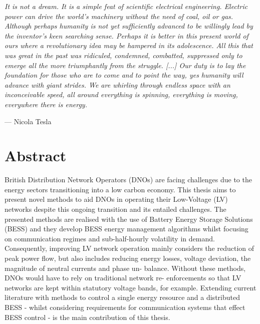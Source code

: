 
\epigraph{\textit{It is not a dream. It is a simple feat of scientific electrical engineering. Electric power can drive the world's machinery without the need of coal, oil or gas. Although perhaps humanity is not yet sufficiently advanced to be willingly lead by the inventor's keen searching sense. Perhaps it is better in this present world of ours where a revolutionary idea may be hampered in its adolescence. All this that was great in the past was ridiculed, condemned, combatted, suppressed only to emerge all the more triumphantly from the struggle. [...] Our duty is to lay the foundation for those who are to come and to point the way, yes humanity will advance with giant strides. We are whirling through endless space with an inconceivable speed, all around everything is spinning, everything is moving, everywhere there is energy.}}{--- Nicola Tesla}


\chapter*{Abstract}




British Distribution Network Operators (DNOs) are facing challenges due to the\linebreak
energy sectors transitioning into a low carbon economy. This thesis aims to present\linebreak
novel methods to aid DNOs in operating their Low-Voltage (LV) networks despite this\linebreak
ongoing transition and its entailed challenges. The presented methods are realised\linebreak
with the use of Battery Energy Storage Solutions (BESS) and they develop BESS\linebreak
energy management algorithms whilst focusing on communication regimes and\linebreak
sub-half-hourly volatility in demand. Consequently, improving LV network operation\linebreak
mainly considers the reduction of peak power flow, but also includes reducing\linebreak
energy losses, voltage deviation, the magnitude of neutral currents and phase un-\linebreak
balance. Without these methods, DNOs would have to rely on traditional network re-\linebreak
enforcements so that LV networks are kept within statutory voltage bands, for\linebreak
example. Extending current literature with methods to control a single energy\linebreak
resource and a distributed BESS - whilst considering requirements for communication\linebreak
systems that effect BESS control - is the main contribution of this thesis.

